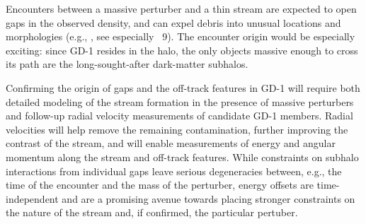 \documentclass[modern]{aastex62}
\begin{document}
Encounters between a massive perturber and a thin stream are expected to open gaps in the observed density, and can expel debris into unusual locations and morphologies (e.g., \citealt{Yoon:2011}, see especially \figurename~9).
The encounter origin would be especially exciting: since GD-1 resides in the halo, the only objects massive enough to cross its path are the long-sought-after dark-matter subhalos.

Confirming the origin of gaps and the off-track features in GD-1 will require
both detailed modeling of the stream formation in the presence of massive
perturbers and follow-up radial velocity measurements of candidate GD-1 members.
Radial velocities will help remove the remaining contamination, further
improving the contrast of the stream, and will enable measurements of energy and
angular momentum along the stream and off-track features.
While constraints on subhalo interactions from individual gaps leave serious
degeneracies between, e.g., the time of the encounter and the mass of the
perturber, energy offsets are time-independent and are a promising avenue
towards placing stronger constraints on the nature of the stream and, if
confirmed, the particular pertuber.





\end{document}
